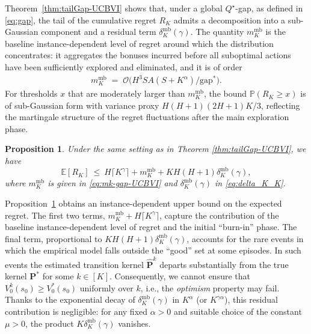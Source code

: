 \documentclass[11pt]{article}
\newcommand{\pp}{\boldsymbol{P}}
\newcommand{\PP}{\mathbb{P}}
\newtheorem{prop}{Proposition}
\newcommand{\gapstar}{\mathrm{gap}^*}
\begin{document}
Theorem~\ref{thm:tailGap-UCBVI} shows that, under a global $Q^\star$-gap, as defined in \eqref{eq:gap}, the tail of the cumulative regret $R_K$ admits a decomposition into a sub-Gaussian component and a residual term $\delta_K^{\mathrm{mb}}(\gamma)$. The quantity $m_K^{\mathrm{mb}}$ is the baseline instance-dependent level of regret around which the distribution concentrates: it aggregates the bonuses incurred before all suboptimal actions have been sufficiently explored and eliminated, and it is of order
\begin{align*}
    m_K^{\mathrm{mb}} \;=\; \mathcal O\!\big(H^3 SA(S+K^\alpha)/\gapstar\big).
\end{align*} 
For thresholds $x$ that are moderately larger than $m_K^{\mathrm{mb}}$, the bound
$\PP(R_K \ge x)$ is of sub-Gaussian form with variance proxy $H(H+1)(2H+1)K/3$, reflecting the martingale structure of the regret fluctuations after the main exploration phase.

\begin{prop}
\label{prop:expectGap-UCBVI}
Under the same setting as in Theorem \ref{thm:tailGap-UCBVI}, we have
\[
\mathbb E[R_K]
\ \le\
H\lceil K^\gamma\rceil + m_K^{\mathrm{mb}} + KH(H+1)\delta_K^{\mathrm{mb}}(\gamma),
\]
where $m_K^{\mathrm{mb}}$ is given in \eqref{eq:mk-gap-UCBVI} and $\delta_K^{\mathrm{mb}}(\gamma)$ in \eqref{eq:delta_K_K}. 
\end{prop}
Proposition~\ref{prop:expectGap-UCBVI} obtains an instance-dependent upper bound on the expected regret. The first two terms, $m_K^{\mathrm{mb}} + H\lceil K^\gamma\rceil$, capture the contribution of the baseline instance-dependent level of regret and the initial ``burn-in'' phase. The final term, proportional to $ KH(H+1)\delta_K^{\mathrm{mb}}(\gamma)$, accounts for the rare events in which the empirical model falls outside the ``good'' set at some episodes. In such events the estimated transition kernel $\hat{\pp}^k$ departs substantially from the true kernel $\pp^*$ for some $k\in[K]$. Consequently, we cannot ensure that $V^k_0(s_0)\ge V^*_0(s_0)$ uniformly over $k$, i.e., the \emph{optimism} property may fail. Thanks to the exponential decay of $\delta_K^{\mathrm{mb}}(\gamma)$ in $K^\alpha$ (or $K^{\gamma\alpha}$), this residual contribution is negligible: for any fixed $\alpha>0$ and suitable choice of the constant $\mu > 0$, the product $K\delta_K^{\mathrm{mb}}(\gamma)$ vanishes.
\end{document}
